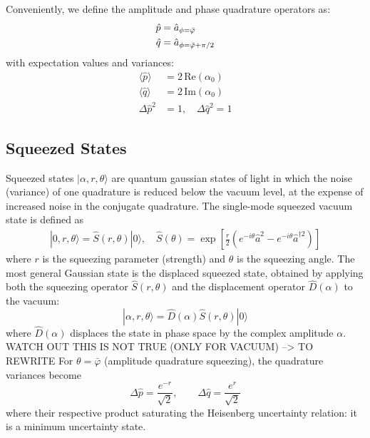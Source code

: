 Conveniently, we define the amplitude and phase quadrature operators as:
\begin{equation}
  \begin{split}
    \hat{p} &= \hat{a}_{\phi=\bar{\varphi}\vphantom{\pi/2}}  \\
    \hat{q} &= \hat{a}_{\phi=\bar{\varphi}+\pi/2}
  \end{split}
\end{equation}
with expectation values and variances:  
\begin{equation}
\begin{aligned}
  \langle \hat{p} \rangle &= 2\,\mathrm{Re}(\alpha_0 ) \\
  \langle \hat{q} \rangle &= 2\,\mathrm{Im}(\alpha_0) \\
  \Delta \hat{p}^2 &= 1, \quad \Delta \hat{q}^2 = 1
\end{aligned}
\end{equation}

\subsection*{Squeezed States}

Squeezed states $|\alpha, r, \theta\rangle $ are quantum gaussian states of light in which the noise (variance) of one quadrature is reduced below the vacuum level, at the expense of increased noise in the conjugate quadrature. The single-mode squeezed vacuum state is defined as
\begin{align}
|0, r, \theta \rangle = \hat{S}(r, \theta) |0\rangle , \quad \hat{S}(\theta) = \exp\left[\frac{r}{2}(e^{-i\theta} \hat{a}^2 - e^{-i\theta} \hat{a}^{\dagger 2})\right]
\end{align}
where $r$ is the squeezing parameter (strength) and $\theta$ is the squeezing angle. The most general Gaussian state is the displaced squeezed state, obtained by applying both the squeezing operator $\hat{S}(r, \theta)$ and the displacement operator $\hat{D}(\alpha)$ to the vacuum:
\begin{equation}
|\alpha, r, \theta\rangle = \hat{D}(\alpha)\hat{S}(r, \theta)|0\rangle
\end{equation}
where $\hat{D}(\alpha)$ displaces the state in phase space by the complex amplitude $\alpha$.\\


\color{red}
WATCH OUT THIS IS NOT TRUE (ONLY FOR VACUUM) --> TO REWRITE 
\color{black}
For $\theta = \bar{\varphi}$ (amplitude quadrature squeezing), the quadrature variances become
\begin{equation}
\Delta \hat{p} = \frac{e^{-r}}{\sqrt{2}}, \qquad \Delta \hat{q} = \frac{e^{r}}{\sqrt{2}}
\end{equation}
where their respective product saturating the Heisenberg uncertainty relation: it is a minimum uncertainty state.\\ 

